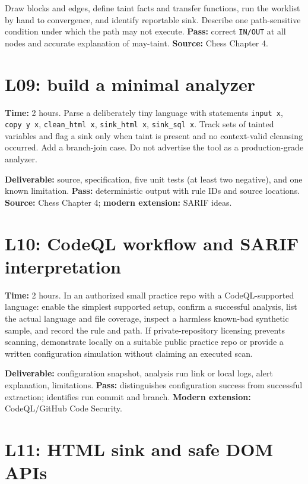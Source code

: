\documentclass[
  letterpaper,
]{article}
\begin{document}
Draw blocks and edges, define taint facts and transfer functions, run
the worklist by hand to convergence, and identify reportable sink.
Describe one path-sensitive condition under which the path may not
execute. \textbf{Pass:} correct \texttt{IN/OUT} at all nodes and
accurate explanation of may-taint. \textbf{Source:} Chess Chapter 4.

\section{L09: build a minimal
analyzer}\label{l09-build-a-minimal-analyzer}

\textbf{Time:} 2 hours. Parse a deliberately tiny language with
statements \texttt{input\ x}, \texttt{copy\ y\ x},
\texttt{clean\_html\ x}, \texttt{sink\_html\ x}, \texttt{sink\_sql\ x}.
Track sets of tainted variables and flag a sink only when taint is
present and no context-valid cleansing occurred. Add a branch-join case.
Do not advertise the tool as a production-grade analyzer.

\textbf{Deliverable:} source, specification, five unit tests (at least
two negative), and one known limitation. \textbf{Pass:} deterministic
output with rule IDs and source locations. \textbf{Source:} Chess
Chapter 4; \textbf{modern extension:} SARIF ideas.

\section{L10: CodeQL workflow and SARIF
interpretation}\label{l10-codeql-workflow-and-sarif-interpretation}

\textbf{Time:} 2 hours. In an authorized small practice repo with a
CodeQL-supported language: enable the simplest supported setup, confirm
a successful analysis, list the actual language and file coverage,
inspect a harmless known-bad synthetic sample, and record the rule and
path. If private-repository licensing prevents scanning, demonstrate
locally on a suitable public practice repo or provide a written
configuration simulation without claiming an executed scan.

\textbf{Deliverable:} configuration snapshot, analysis run link or local
logs, alert explanation, limitations. \textbf{Pass:} distinguishes
configuration success from successful extraction; identifies run commit
and branch. \textbf{Modern extension:} CodeQL/GitHub Code Security.

\section{L11: HTML sink and safe DOM
APIs}\label{l11-html-sink-and-safe-dom-apis}
\end{document}
